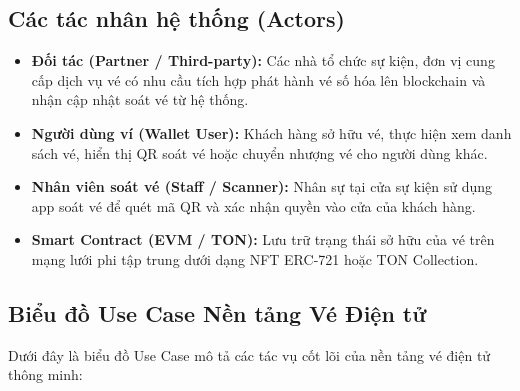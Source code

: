 \documentclass[a4paper]{report}
\begin{document}
\subsection{Các tác nhân hệ thống (Actors)}
\begin{itemize}
    \item \textbf{Đối tác (Partner / Third-party):} Các nhà tổ chức sự kiện, đơn vị cung cấp dịch vụ vé có nhu cầu tích hợp phát hành vé số hóa lên blockchain và nhận cập nhật soát vé từ hệ thống.
    \item \textbf{Người dùng ví (Wallet User):} Khách hàng sở hữu vé, thực hiện xem danh sách vé, hiển thị QR soát vé hoặc chuyển nhượng vé cho người dùng khác.
    \item \textbf{Nhân viên soát vé (Staff / Scanner):} Nhân sự tại cửa sự kiện sử dụng app soát vé để quét mã QR và xác nhận quyền vào cửa của khách hàng.
    \item \textbf{Smart Contract (EVM / TON):} Lưu trữ trạng thái sở hữu của vé trên mạng lưới phi tập trung dưới dạng NFT ERC-721 hoặc TON Collection.
\end{itemize}

\subsection{Biểu đồ Use Case Nền tảng Vé Điện tử}

Dưới đây là biểu đồ Use Case mô tả các tác vụ cốt lõi của nền tảng vé điện tử thông minh:
\end{document}
